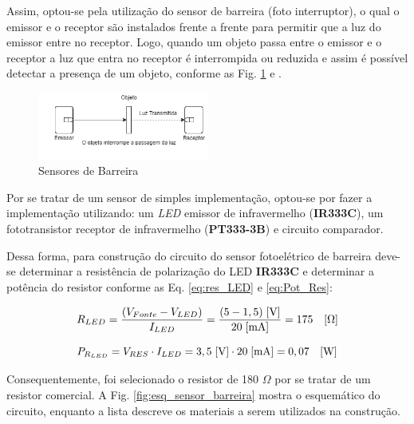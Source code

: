     Assim, optou-se pela utilização do sensor de barreira (foto interruptor), o qual o emissor e o receptor são instalados frente a frente para permitir que a luz do emissor entre no receptor. Logo, quando um objeto passa entre o emissor e o receptor a luz que entra no receptor é interrompida ou reduzida e assim é possível detectar a presença de um objeto, conforme as Fig. \ref{fig:sensor_infra} e  \cite{amron_photo_sensors}.
    
    \begin{figure}[H]
        \centering
        \includegraphics[width=0.5\textwidth]{figuras/eletronica/fotos_componentes/sensor_infra.png}
        \caption{Sensores de Barreira}
        \label{fig:sensor_infra}
    \end{figure}
    
    Por se tratar de um sensor de simples implementação, optou-se por fazer a implementação utilizando: um \textit{LED} emissor de infravermelho (\textbf{IR333C}), um fototransistor receptor de infravermelho (\textbf{PT333-3B}) e circuito comparador.
    
    Dessa forma, para construção do circuito do sensor fotoelétrico de barreira deve-se determinar a resistência de polarização do LED \textbf{IR333C} e determinar a potência do resistor conforme as Eq. \ref{eq:res_LED} e \ref{eq:Pot_Res}:
    
    \begin{equation}
        R_{LED} = \frac{(V_{Fonte} - V_{LED})}{I_{LED}} = \frac{( 5 - 1,5) \hspace{0.1cm} [\text{V}]}{20 \hspace{0.1cm} [\text{mA}]} = 175 \quad [\Omega]
        \label{eq:res_LED}
    \end{equation}
    
        \begin{equation}
        P_{R_{LED}} = V_{RES} \cdot I_{LED} = 3,5 \hspace{0.1cm}
        [\text{V}] \cdot 20 \hspace{0.1cm} [\text{mA}] = 0,07 \quad [\text{W}] 
        \label{eq:Pot_Res}
    \end{equation}
    
    Consequentemente, foi selecionado o resistor de 180 $\Omega$ por se tratar de um resistor comercial. A Fig. \ref{fig:esq_sensor_barreira} mostra o esquemático do circuito, enquanto a lista descreve os materiais a serem utilizados na construção.
    
